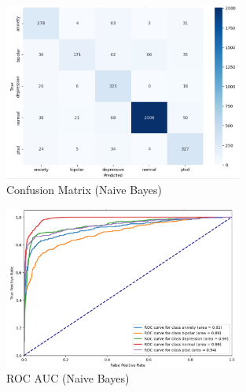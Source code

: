 \vspace{0.25em}

\begin{figure}[h!]  
    \centering
    \includegraphics[width=0.7\textwidth]{Images/NB Confusion Matrix.png}  
    \caption{Confusion Matrix (Naive Bayes)}
    \label{NBCM}  %
\end{figure}


\begin{figure}[h!]  
    \centering
    \includegraphics[width=0.7\textwidth]{Images/NB ROC.png}  
    \caption{ROC AUC (Naive Bayes)}
    \label{NBROC}  %
\end{figure}

